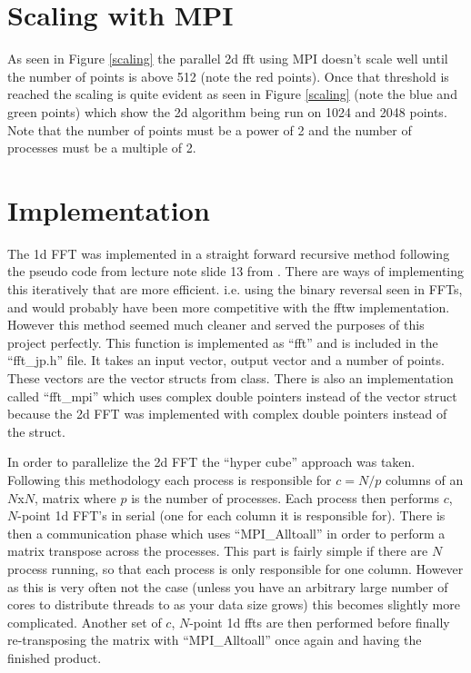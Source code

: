 \documentclass[12pt]{article}
\begin{document}
\section{Scaling with MPI}
As seen in Figure \ref{scaling} the parallel 2d fft using MPI doesn't scale well until
the number of points is above 512 (note the red points). Once that threshold is reached the scaling
is quite evident as seen in Figure \ref{scaling} (note the blue and green points) which show the 2d algorithm
being run on 1024 and 2048 points. Note that the number of points must
be a power of 2 and the number of processes must be a multiple of 2.


\section{Implementation}
The 1d FFT was implemented in a straight forward recursive method following
the pseudo code from lecture note slide 13 from \cite{Heath2011}. There are 
ways of implementing this iteratively
that are more efficient. i.e. using the binary reversal seen in FFTs, and
would probably have been more competitive with the fftw implementation.
However this method seemed much cleaner and served the purposes of this
project perfectly. This function is implemented as ``fft'' and is included
in the ``fft\_jp.h'' file. It takes an input vector, output vector and
a number of points. These vectors are the vector structs from class. There
is also an implementation called ``fft\_mpi'' which uses complex double
pointers instead of the vector struct because the 2d FFT was implemented with
complex double pointers instead of the struct.

In order to parallelize the 2d FFT the ``hyper cube'' approach was taken. Following this methodology each process is responsible for $c = N / p$ columns of
an $N$x$N$, matrix where $p$ is the number of processes. Each process then performs $c$, $N$-point 1d FFT's in serial (one for each column it is responsible for).
There is then a communication phase which uses ``MPI\_Alltoall'' in order to perform a matrix transpose across the processes. This part is fairly simple if
there are $N$ process running, so that each process is only responsible for one column. However as this is very often not the case (unless you have an arbitrary
large number of cores to distribute threads to as your data size grows) this becomes slightly more complicated. Another set of $c$, $N$-point 1d ffts are then
performed before finally re-transposing the matrix with ``MPI\_Alltoall'' once 
again and having the finished product. 
\end{document}
